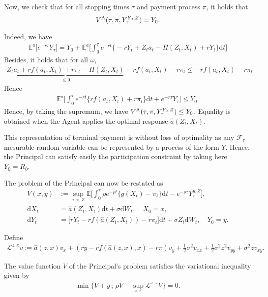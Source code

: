 \documentclass[a4paper,10pt]{article}
\newcommand{\E}{\mathbb{E}}
\newcommand{\dd}{\mathrm{d}}
\def \Lc{\mathcal{L}}
\theoremstyle{definition}
\theoremstyle{plain}
\numberwithin{equation}{section}
\newcommand{\hs}{\vspace{3mm}}
\begin{document}
Now, we check that for all stopping times $\tau$ and payment process $\pi$, it holds that  
\begin{align}
V^{\rm A}(\tau,\pi,Y_\tau^{Y_0,Z}) = Y_0.
\end{align}

Indeed, we have
\begin{align*}
\E^{a}\big[ e^{-r \tau} Y_\tau\big] = Y_0 + \E^{a}\Big[ \int_0^\tau e^{-r t} \big\{-r Y_t + Z_t a_t - H(Z_t,X_t) + r Y_t \big\} \dd t\Big]
\end{align*}
Besides, it holds that for all $\omega$, 
\begin{align*}
\underbrace{Z_t a_t + r f(a_t,X_t) + r \pi_t - H(Z_t,X_t)}_{\leq 0} - r f(a_t,X_t) - r \pi_t \leq  - r f(a_t,X_t) - r \pi_t
\end{align*}
Hence
\begin{align*}
\E^{a}\Big[ \int_0^\tau e^{-r t} \big\{ r f( a_t,X_t) + r \pi_t \big\} \dd t + e^{-r \tau} Y_\tau\Big] \leq  Y_0.
\end{align*}
Hence, by taking the supremum, we have $V^{\rm A}(\tau,\pi,Y_\tau^{Y_0,Z}) \leq Y_0$. Equality is obtained when the Agent applies the optimal response $\hat{a}(Z_t,X_t)$.

\hs
This representation of terminal payment is without loss of optimality as any $\mathcal F_\tau$ mesurable random variable can be represented by a process of the form $Y$. Hence, the Principal can satisfy easily the participation constraint by taking here $Y_0 = R_0$.

\hs

The problem of the Principal can now be restated as
\begin{align}\label{eq:P}
V(x,y) & := \sup_{\tau,\pi,Z} \E\Big[ \int_0^\tau \rho e^{- \rho t}\big\{ g(X_t) - \pi_t \big\} \dd t - e^{-\rho \tau} Y_\tau^{y,Z} \Big], \\
\dd X_t & = \hat{a}(Z_t,X_t) \dd t + \sigma \dd W_t, \quad X_0 = x,\\
\dd Y_t & = \big[r Y_t - r f(\hat{a}(Z_t,X_t)) - r \pi_t \big] \dd t + \sigma Z_t \dd W_t, \quad Y_0 = y.
\end{align}

Define 
\begin{align*}
\Lc^{z,\pi} v := \hat{a}(z,x) v_x + (ry - r f(\hat{a}(z,x),x) - r \pi) v_y + \frac12 \sigma^2 v_{xx} + \frac12 \sigma^2 z^2 v_{yy} + \sigma^2 z v_{xy}.
\end{align*}

The value function $V$ of the Principal's problem satisfies the variational inequality given by
\begin{align}\label{eq:P-VI}
\min\big\{ V + y \, ; \, \rho V - \sup_{z,\pi} \Lc^{z,\pi}V \big\} = 0.
\end{align}
\end{document}
